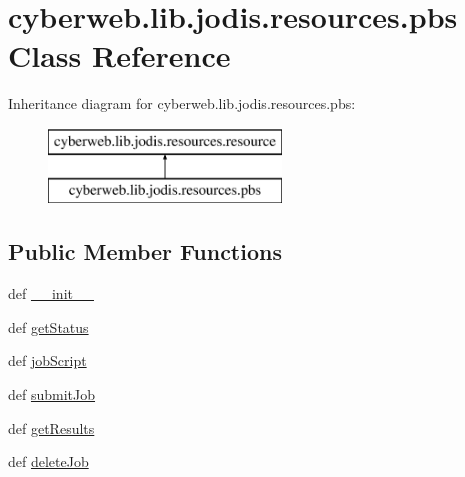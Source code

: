 \hypertarget{classcyberweb_1_1lib_1_1jodis_1_1resources_1_1pbs}{\section{cyberweb.\-lib.\-jodis.\-resources.\-pbs \-Class \-Reference}
\label{classcyberweb_1_1lib_1_1jodis_1_1resources_1_1pbs}
}
\-Inheritance diagram for cyberweb.\-lib.\-jodis.\-resources.\-pbs\-:\begin{figure}[H]
\begin{center}
\leavevmode
\includegraphics[height=2.000000cm]{classcyberweb_1_1lib_1_1jodis_1_1resources_1_1pbs}
\end{center}
\end{figure}
\subsection*{\-Public \-Member \-Functions}
\begin{DoxyCompactItemize}
\item 
def \hyperlink{classcyberweb_1_1lib_1_1jodis_1_1resources_1_1pbs_a2b23b87d46605b6b787be92628a5d930}{\-\_\-\-\_\-init\-\_\-\-\_\-}
\item 
def \hyperlink{classcyberweb_1_1lib_1_1jodis_1_1resources_1_1pbs_aef2e2bd73f862347f8a46754fa3f3fa9}{get\-Status}
\item 
def \hyperlink{classcyberweb_1_1lib_1_1jodis_1_1resources_1_1pbs_abde0343e0bb10877545263cf5b00412e}{job\-Script}
\item 
def \hyperlink{classcyberweb_1_1lib_1_1jodis_1_1resources_1_1pbs_a2f0daf006e6244a45de7aa28022a4c14}{submit\-Job}
\item 
def \hyperlink{classcyberweb_1_1lib_1_1jodis_1_1resources_1_1pbs_a1d71d54b835b1db8782b420d38d05dce}{get\-Results}
\item 
def \hyperlink{classcyberweb_1_1lib_1_1jodis_1_1resources_1_1pbs_a6b0104831978ab59b213f77b5541411c}{delete\-Job}
\end{DoxyCompactItemize}
